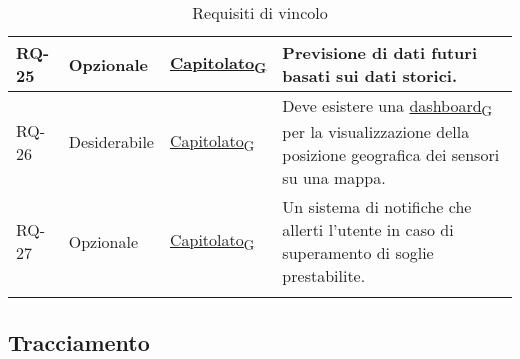 \begin{longtable}{|>{\centering\arraybackslash}m{}|>{\centering\arraybackslash}m{}|>{\centering\arraybackslash}m{}|>{\centering\arraybackslash}m{}|}
	RQ-25           & Opzionale           & \href{https://7last.github.io/docs/rtb/documentazione-interna/glossario\#capitolato}{Capitolato\textsubscript{G}}     & Previsione di dati futuri basati sui dati storici.                                                      \\\hline
	RQ-26           & Desiderabile        & \href{https://7last.github.io/docs/rtb/documentazione-interna/glossario\#capitolato}{Capitolato\textsubscript{G}}     & Deve esistere una \href{https://7last.github.io/docs/rtb/documentazione-interna/glossario\#dashboard}{dashboard\textsubscript{G}} per la visualizzazione della posizione geografica dei sensori su una mappa. \\\hline
	RQ-27           & Opzionale           & \href{https://7last.github.io/docs/rtb/documentazione-interna/glossario\#capitolato}{Capitolato\textsubscript{G}}     & Un sistema di notifiche che allerti l'utente in caso di superamento di soglie prestabilite.             \\\hline
	\caption{Requisiti di vincolo}
	\label{table:3}
\end{longtable}


\subsection{Tracciamento}
